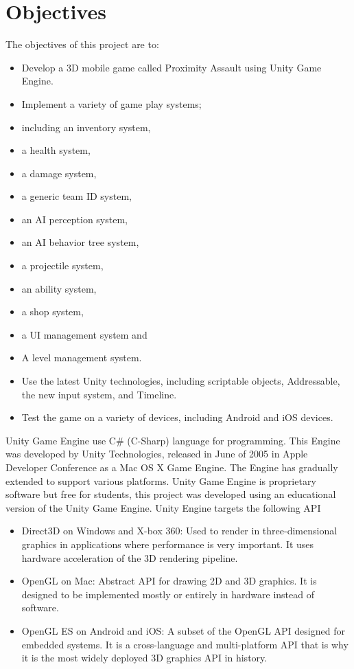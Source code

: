 \section{Objectives}
The objectives of this project are to:
\begin{itemize}
\item	Develop a 3D mobile game called Proximity Assault using Unity Game Engine.
\item	Implement a variety of game play systems;
\item	including an inventory system,
\item	a health system, 
\item   a damage system, 
\item	a generic team ID system,
\item	an AI perception system,
\item	an AI behavior tree system,
\item	a projectile system,
\item	an ability system,
\item	a shop system,
\item	a UI management system and 
\item	A level management system.
\item	Use the latest Unity technologies, including scriptable objects, Addressable, the new input system, and Timeline.
\item	Test the game on a variety of devices, including Android and iOS devices.
\end{itemize}

Unity Game Engine use C\# (C-Sharp) language for programming. This Engine was developed by Unity Technologies, released in June of 2005 in Apple Developer Conference as a Mac OS X Game Engine. The Engine has gradually extended to support various platforms. Unity Game Engine is proprietary software but free for students, this project was developed using an educational version of the Unity Game Engine.
Unity Engine targets the following API
\begin{itemize}
\item  {Direct3D on Windows and X-box 360:} Used to render in three-dimensional graphics in applications where performance is very important. It uses hardware acceleration of the 3D rendering pipeline.
\item {OpenGL on Mac:} Abstract API for drawing 2D and 3D graphics. It is designed to be implemented mostly or entirely in hardware instead of software.
\item  {OpenGL ES on Android and iOS:} A subset of the OpenGL API designed for embedded systems. It is a cross-language and multi-platform API that is why it is the most widely deployed 3D graphics API in history.
\end{itemize}

